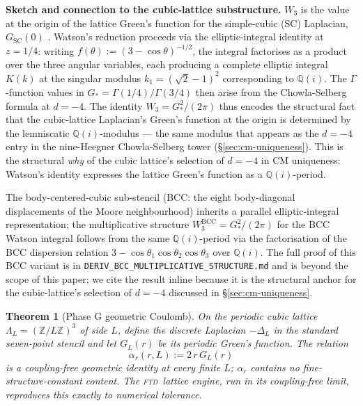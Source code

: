 \documentclass[11pt,reqno]{amsart}
\theoremstyle{plain}
\newtheorem{theorem}{Theorem}[section]
\theoremstyle{definition}
\theoremstyle{remark}
\numberwithin{equation}{section}
\newcommand{\Gstar}{G_{\!*}}
\newcommand{\FTD}{\textsc{ftd}}
\begin{document}
\textbf{Sketch and connection to the cubic-lattice substructure.}
$W_{3}$ is the value at the origin of the lattice Green's function
for the simple-cubic (SC) Laplacian, $G_{\mathrm{SC}}(0)$
\cite{watson1939,joyce1972,glasser}. Watson's reduction proceeds via
the elliptic-integral identity at $z = 1/4$: writing
$f(\theta) := (3 - \cos\theta)^{-1/2}$, the integral factorises as a
product over the three angular variables, each producing a complete
elliptic integral $K(k)$ at the singular modulus $k_{1} = (\sqrt{2} - 1)^{2}$
corresponding to $\mathbb{Q}(i)$. The $\Gamma$-function values in
$\Gstar = \Gamma(1/4)/\Gamma(3/4)$ then arise from the Chowla-Selberg
formula \cite{chowlaselberg1949,selberg-chowla1967} at $d = -4$.
The identity $W_{3} = \Gstar^{2}/(2\pi)$ thus encodes the structural
fact that the cubic-lattice Laplacian's Green's function at the
origin is determined by the lemniscatic $\mathbb{Q}(i)$-modulus —
the same modulus that appears as the $d = -4$ entry in the
nine-Heegner Chowla-Selberg tower (\S\ref{sec:cm-uniqueness}). This
is the structural \emph{why} of the cubic lattice's selection of
$d = -4$ in CM uniqueness: Watson's identity expresses the lattice
Green's function as a $\mathbb{Q}(i)$-period.

The body-centered-cubic sub-stencil (BCC: the eight body-diagonal
displacements of the Moore neighbourhood) inherits a parallel
elliptic-integral representation; the multiplicative structure
$W_{3}^{\mathrm{BCC}} = \Gstar^{2}/(2\pi)$ for the BCC Watson
integral follows from the same $\mathbb{Q}(i)$-period via the
factorisation of the BCC dispersion relation
$3 - \cos\theta_{1}\cos\theta_{2}\cos\theta_{3}$ over $\mathbb{Q}(i)$.
The full proof of this BCC variant is in
\texttt{DERIV\_BCC\_MULTIPLICATIVE\_STRUCTURE.md} and is beyond the
scope of this paper; we cite the result inline because it is the
structural anchor for the cubic-lattice's selection of $d = -4$
discussed in \S\ref{sec:cm-uniqueness}.

\begin{theorem}[Phase G geometric Coulomb]
\label{thm:phaseg}
On the periodic cubic lattice $\Lambda_{L} = (\mathbb{Z}/L\mathbb{Z})^{3}$
of side $L$, define the discrete Laplacian $-\Delta_{L}$ in the standard
seven-point stencil and let $G_{L}(r)$ be its periodic Green's function.
The relation
\[
  \alpha_{r}(r, L) := 2\,r\,G_{L}(r)
\]
is a coupling-free geometric identity at every finite $L$;
$\alpha_{r}$ contains no fine-structure-constant content.
The \FTD\ lattice engine, run in its coupling-free limit, reproduces
this exactly to numerical tolerance.
\end{theorem}
\end{document}
